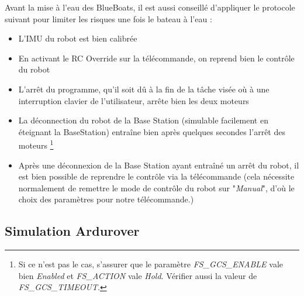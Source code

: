     Avant la mise à l'eau des BlueBoats, il est aussi conseillé d'appliquer le protocole suivant pour limiter les risques une fois le bateau à l'eau : 

    \begin{itemize}
        \item L'IMU du robot est bien calibrée
        \item En activant le RC Override sur la télécommande, on reprend bien le contrôle du robot
        \item L'arrêt du programme, qu'il soit dû à la fin de la tâche visée où à une interruption clavier de l'utilisateur, arrête bien les deux moteurs
        \item La déconnection du robot de la Base Station (simulable facilement en éteignant la BaseStation) entraîne bien après quelques secondes l'arrêt des moteurs \footnote{Si ce n'est pas le cas, s'assurer que le paramètre \textit{FS_GCS_ENABLE} vale bien \textit{Enabled} et \textit{FS_ACTION} vale \textit{Hold}. Vérifier aussi la valeur de \textit{FS_GCS_TIMEOUT}.}
        \item Après une déconnexion de la Base Station ayant entraîné un arrêt du robot, il est bien possible de reprendre le contrôle via la télécommande (cela nécessite normalement de remettre le mode de contrôle du robot sur "\textit{Manual}", d'où le choix des paramètres pour notre télécommande.)
    \end{itemize}

\subsection{Simulation Ardurover}

